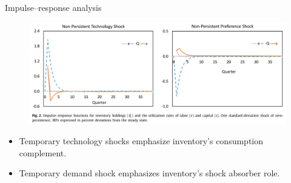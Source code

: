 \documentclass[fontset=windows,12pt,t,aspectratio=169]{beamer}
\begin{document}
\begin{frame}{Impulse–response analysis}
    \begin{figure}
         \begin{center}
         \includegraphics[scale=0.5]{table/fig2.png}
         \end{center}
    \end{figure}
    \begin{itemize}
    \item Temporary technology shocks emphasize inventory's consumption complement.
    \item Temporary demand shock emphasizes inventory's shock absorber role.
    \end{itemize}
\end{frame}
\end{document}
